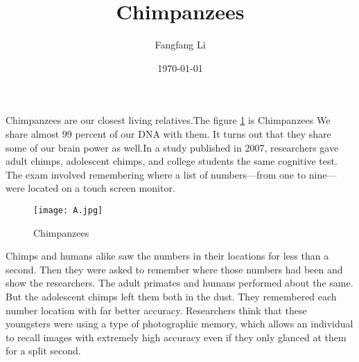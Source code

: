 \documentclass{article}
\title{Chimpanzees}
\author{Fangfang Li}
\date{\today}
\begin{document}
\maketitle
Chimpanzees are our closest living relatives.The figure \ref{1} is Chimpanzees We share almost 99 percent of our DNA with them. It turns out that they share some of our brain power as well.In a study published in 2007, researchers gave adult chimps, adolescent chimps, and college students the same cognitive test. The exam involved remembering where a list of numbers—from one to nine—were located on a touch screen monitor.

\begin{figure}[htbp]
\centering
\texttt{[image: A.jpg]}
\caption{Chimpanzees}
\label{1}
\end{figure}

\par Chimps and humans alike saw the numbers in their locations for less than a second.\cite{higham1994bibtex} Then they were asked to remember where those numbers had been and show the researchers. The adult primates and humans performed about the same. But the adolescent chimps left them both in the dust. They remembered each number location with far better accuracy. Researchers think that these youngsters were using a type of photographic memory, which allows an individual to recall images with extremely high accuracy even if they only glanced at them for a split second.
\renewcommand\refname{Reference}


\end{document}
